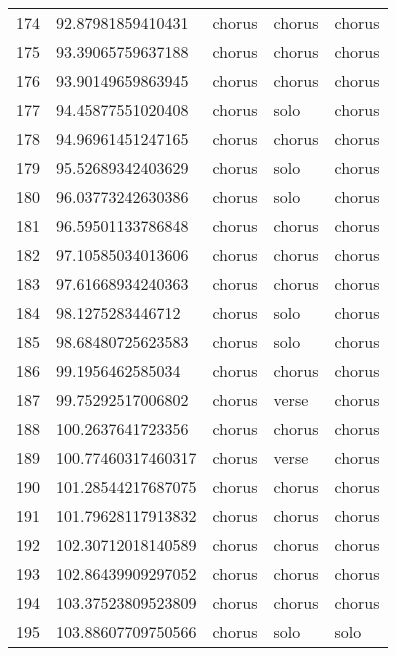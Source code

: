 \begin{table}[]
\begin{tabular}{lllll}
    174  & 92.87981859410431  & chorus       & chorus          & chorus         \\
    175  & 93.39065759637188  & chorus       & chorus          & chorus         \\
    176  & 93.90149659863945  & chorus       & chorus          & chorus         \\
    177  & 94.45877551020408  & chorus       & solo            & chorus         \\
    178  & 94.96961451247165  & chorus       & chorus          & chorus         \\
    179  & 95.52689342403629  & chorus       & solo            & chorus         \\
    180  & 96.03773242630386  & chorus       & solo            & chorus         \\
    181  & 96.59501133786848  & chorus       & chorus          & chorus         \\
    182  & 97.10585034013606  & chorus       & chorus          & chorus         \\
    183  & 97.61668934240363  & chorus       & chorus          & chorus         \\
    184  & 98.1275283446712   & chorus       & solo            & chorus         \\
    185  & 98.68480725623583  & chorus       & solo            & chorus         \\
    186  & 99.1956462585034   & chorus       & chorus          & chorus         \\
    187  & 99.75292517006802  & chorus       & verse           & chorus         \\
    188  & 100.2637641723356  & chorus       & chorus          & chorus         \\
    189  & 100.77460317460317 & chorus       & verse           & chorus         \\
    190  & 101.28544217687075 & chorus       & chorus          & chorus         \\
    191  & 101.79628117913832 & chorus       & chorus          & chorus         \\
    192  & 102.30712018140589 & chorus       & chorus          & chorus         \\
    193  & 102.86439909297052 & chorus       & chorus          & chorus         \\
    194  & 103.37523809523809 & chorus       & chorus          & chorus         \\
    195  & 103.88607709750566 & chorus       & solo            & solo           \\

\end{tabular}
\end{table}
